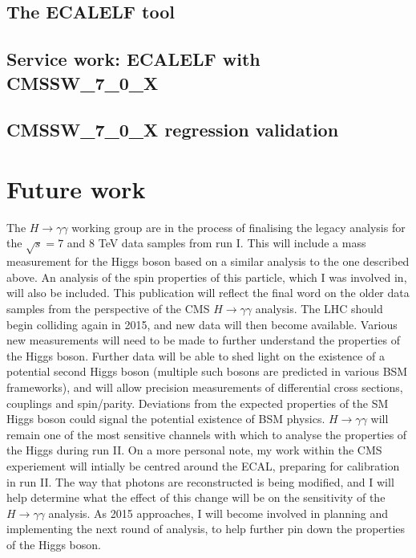\documentclass[10pt]{article}
\begin{document}
\subsection{The ECALELF tool}

\subsection{Service work: ECALELF with CMSSW\_7\_0\_X}

\subsection{CMSSW\_7\_0\_X regression validation}

\newpage

\section{Future work}

The $H \rightarrow \gamma \gamma$ working group are in the process of finalising the legacy analysis for the $\sqrt{s}=7$ and $8$ TeV data samples from run I. This will include a mass measurement for the Higgs boson based on a similar analysis to the one described above. An analysis of the spin properties of this particle, which I was involved in, will also be included. This publication will reflect the final word on the older data samples from the perspective of the CMS $H \rightarrow \gamma \gamma$ analysis. The LHC should begin colliding again in 2015, and new data will then become available. Various new measurements will need to be made to further understand the properties of the Higgs boson. Further data will be able to shed light on the existence of a potential second Higgs boson (multiple such bosons are predicted in various BSM frameworks), and will allow precision measurements of differential cross sections, couplings and spin/parity. Deviations from the expected properties of the SM Higgs boson could signal the potential existence of BSM physics.  $H\rightarrow \gamma \gamma$ will remain one of the most sensitive channels with which to analyse the properties of the Higgs during run II.
On a more personal note, my work within the CMS experiement will intially be centred around the ECAL, preparing for calibration in run II. The way that photons are reconstructed is being modified, and I will help determine what the effect of this change will be on the sensitivity of the $H \rightarrow \gamma \gamma$ analysis. As 2015 approaches, I will become involved in planning and implementing the next round of analysis, to help further pin down the properties of the Higgs boson.
\end{document}
